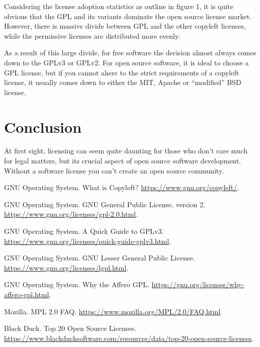 \documentclass[12pt,letterpaper]{article}
\begin{document}
Considering the license adoption statistics as outline in figure 1, it is quite obvious that the GPL and its variants dominate the open source license market. However, there is massive divide between GPL and the other copyleft licenses, while the permissive licenses are distributed more evenly.

As a result of this large divide, for free software the decision almost always comes down to the GPLv3 or GPLv2. For open source software, it is ideal to choose a GPL license, but if you cannot ahere to the strict requirements of a copyleft license, it usually comes down to either the MIT, Apache or ``modified'' BSD license.

\section{Conclusion}
At first sight, licensing can seem quite daunting for those who don't care much for legal matters, but its crucial aspect of open source software development. Without a software license you can't create an open source community.

\newpage

\begin{thebibliography}{9}
 GNU Operating System. What is Copyleft? \url{https://www.gnu.org/copyleft/}.

 GNU Operating System. GNU General Public License, version 2. \url{https://www.gnu.org/licenses/gpl-2.0.html}.

 GNU Operating System. A Quick Guide to GPLv3. \url{https://www.gnu.org/licenses/quick-guide-gplv3.html}.

 GNU Operating System. GNU Lesser General Public License. \url{https://www.gnu.org/licenses/lgpl.html}.

 GNU Operating System. Why the Affero GPL. \url{https://gnu.org/licenses/why-affero-gpl.html}.

 Mozilla. MPL 2.0 FAQ. \url{https://www.mozilla.org/MPL/2.0/FAQ.html}

 Black Duck. Top 20 Open Source Licenses. \url{https://www.blackducksoftware.com/resources/data/top-20-open-source-licenses}.

\end{thebibliography}
\end{document}
